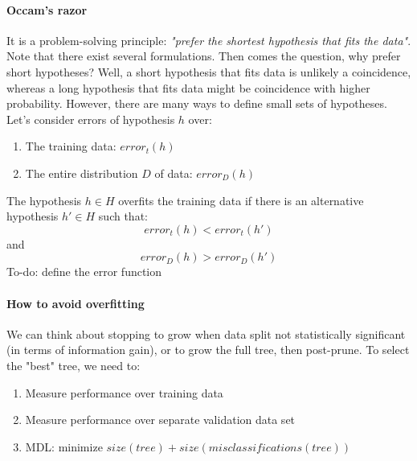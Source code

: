 \paragraph{Occam's razor} It is a problem-solving principle: \textit{"prefer the shortest hypothesis that fits the data"}. Note that there exist several formulations. Then comes the question, why prefer short hypotheses? Well, a short hypothesis that fits data is unlikely a coincidence, whereas a long hypothesis that fits data might be coincidence with higher probability. However,  there are many ways to define small sets of hypotheses.
Let's consider errors of hypothesis $h$ over:
\begin{enumerate}
    \item The training data: $error_t(h)$
    \item The entire distribution $D$ of data: $error_D(h)$
\end{enumerate}
The hypothesis $h \in H$ overfits the training data if there is an alternative hypothesis $h' \in H$ such that:
\begin{equation*}
    error_t (h) < error_t (h')
\end{equation*}
and
\begin{equation*}
    error_D (h) > error_D (h')
\end{equation*}
To-do: define the error function

\paragraph{How to avoid overfitting} We can think about stopping to grow when data split not statistically significant (in terms of information gain), or to grow the full tree, then post-prune. To select the "best" tree, we need to:
\begin{enumerate}
    \item Measure performance over training data
    \item Measure performance over separate validation data set
    \item MDL: minimize $size(tree) + size(misclassifications(tree))$
\end{enumerate}

